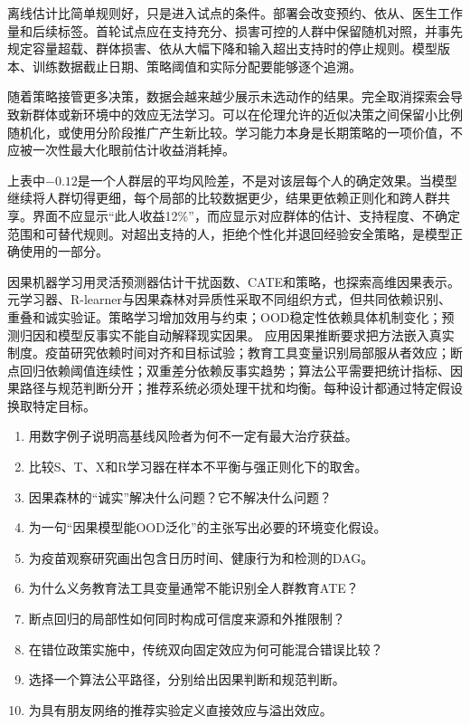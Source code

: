 离线估计比简单规则好，只是进入试点的条件。部署会改变预约、依从、医生工作量和后续标签。首轮试点应在支持充分、损害可控的人群中保留随机对照，并事先规定容量超载、群体损害、依从大幅下降和输入超出支持时的停止规则。模型版本、训练数据截止日期、策略阈值和实际分配要能够逐个追溯。

随着策略接管更多决策，数据会越来越少展示未选动作的结果。完全取消探索会导致新群体或新环境中的效应无法学习。可以在伦理允许的近似决策之间保留小比例随机化，或使用分阶段推广产生新比较。学习能力本身是长期策略的一项价值，不应被一次性最大化眼前估计收益消耗掉。

\begin{failurecheck}[用处理效应排名宣称个体决策已被证明]
上表中$-0.12$是一个人群层的平均风险差，不是对该层每个人的确定效果。当模型继续将人群切得更细，每个局部的比较数据更少，结果更依赖正则化和跨人群共享。界面不应显示“此人收益12\%”，而应显示对应群体的估计、支持程度、不确定范围和可替代规则。对超出支持的人，拒绝个性化并退回经验安全策略，是模型正确使用的一部分。
\end{failurecheck}

\begin{chapterreview}
因果机器学习用灵活预测器估计干扰函数、CATE和策略，也探索高维因果表示。元学习器、R-learner与因果森林对异质性采取不同组织方式，但共同依赖识别、重叠和诚实验证。策略学习增加效用与约束；OOD稳定性依赖具体机制变化；预测归因和模型反事实不能自动解释现实因果。 应用因果推断要求把方法嵌入真实制度。疫苗研究依赖时间对齐和目标试验；教育工具变量识别局部服从者效应；断点回归依赖阈值连续性；双重差分依赖反事实趋势；算法公平需要把统计指标、因果路径与规范判断分开；推荐系统必须处理干扰和均衡。每种设计都通过特定假设换取特定目标。
\end{chapterreview}

\begin{selfcheck}
\begin{enumerate}
  \item 用数字例子说明高基线风险者为何不一定有最大治疗获益。
  \item 比较S、T、X和R学习器在样本不平衡与强正则化下的取舍。
  \item 因果森林的“诚实”解决什么问题？它不解决什么问题？
  \item 为一句“因果模型能OOD泛化”的主张写出必要的环境变化假设。
  \item 为疫苗观察研究画出包含日历时间、健康行为和检测的DAG。
  \item 为什么义务教育法工具变量通常不能识别全人群教育ATE？
  \item 断点回归的局部性如何同时构成可信度来源和外推限制？
  \item 在错位政策实施中，传统双向固定效应为何可能混合错误比较？
  \item 选择一个算法公平路径，分别给出因果判断和规范判断。
  \item 为具有朋友网络的推荐实验定义直接效应与溢出效应。
\end{enumerate}
\end{selfcheck}

